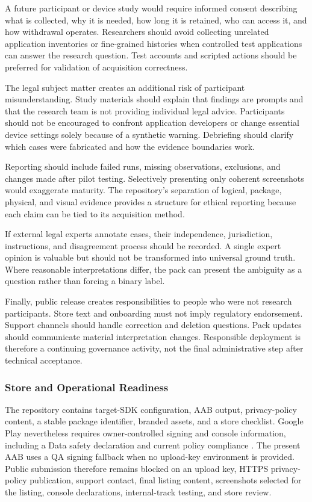 A future participant or device study would require informed consent describing what is collected, why it is needed, how long it is retained, who can access it, and how withdrawal operates. Researchers should avoid collecting unrelated application inventories or fine-grained histories when controlled test applications can answer the research question. Test accounts and scripted actions should be preferred for validation of acquisition correctness.

The legal subject matter creates an additional risk of participant misunderstanding. Study materials should explain that findings are prompts and that the research team is not providing individual legal advice. Participants should not be encouraged to confront application developers or change essential device settings solely because of a synthetic warning. Debriefing should clarify which cases were fabricated and how the evidence boundaries work.

Reporting should include failed runs, missing observations, exclusions, and changes made after pilot testing. Selectively presenting only coherent screenshots would exaggerate maturity. The repository's separation of logical, package, physical, and visual evidence provides a structure for ethical reporting because each claim can be tied to its acquisition method.

If external legal experts annotate cases, their independence, jurisdiction, instructions, and disagreement process should be recorded. A single expert opinion is valuable but should not be transformed into universal ground truth. Where reasonable interpretations differ, the pack can present the ambiguity as a question rather than forcing a binary label.

Finally, public release creates responsibilities to people who were not research participants. Store text and onboarding must not imply regulatory endorsement. Support channels should handle correction and deletion questions. Pack updates should communicate material interpretation changes. Responsible deployment is therefore a continuing governance activity, not the final administrative step after technical acceptance.

\subsubsection{Store and Operational Readiness}

The repository contains target-SDK configuration, AAB output, privacy-policy content, a stable package identifier, branded assets, and a store checklist. Google Play nevertheless requires owner-controlled signing and console information, including a Data safety declaration and current policy compliance \cite{playdatasafety2026,playtarget2026}. The present AAB uses a QA signing fallback when no upload-key environment is provided. Public submission therefore remains blocked on an upload key, HTTPS privacy-policy publication, support contact, final listing content, screenshots selected for the listing, console declarations, internal-track testing, and store review.

